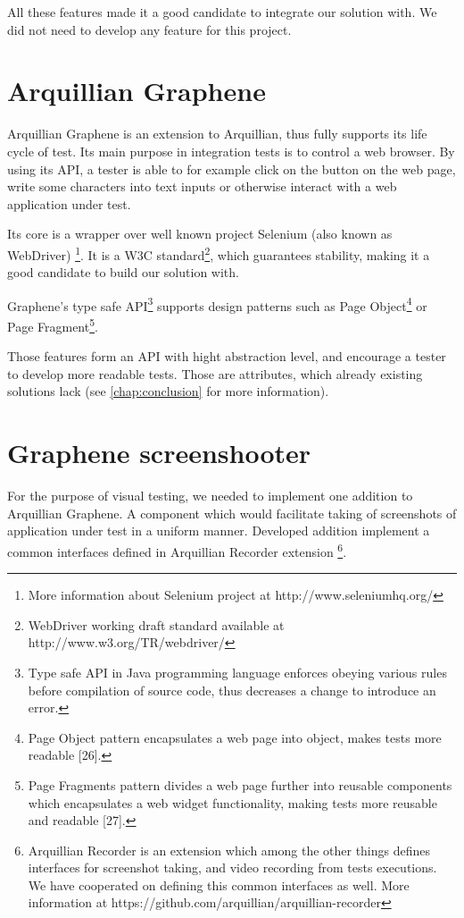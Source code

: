 \documentclass[11pt,oneside,final]{fithesis2}
\begin{document}
All these features made it a good candidate to integrate our solution with. We did not need to develop any
feature for this project.
  
\section{Arquillian Graphene}
Arquillian Graphene is an extension to Arquillian, thus fully supports its life cycle of test. Its main
purpose in integration tests is to control a web browser. By using its API, a tester is able to for example
click on the button on the web page, write some characters into text inputs or otherwise interact with
a web application under test.

Its core is a wrapper over well known project Selenium (also known as WebDriver) 
\footnote{More information about Selenium project at http://www.seleniumhq.org/}. It is a W3C 
standard\footnote{WebDriver working draft standard available at http://www.w3.org/TR/webdriver/},
which guarantees stability, making it a good candidate to build our solution with.

Graphene's type safe API\footnote{Type safe API in Java programming language enforces obeying various rules
before compilation of source code, thus decreases a change to introduce an error.} supports design patterns
such as Page Object\footnote{Page Object pattern encapsulates a web page into object, makes tests
more readable [26].} or Page Fragment\footnote{Page Fragments pattern divides a web page further into reusable 
components which encapsulates a web widget functionality, making tests more reusable and readable [27].}.

Those features form an API with hight abstraction level, and encourage a tester to develop more readable
tests. Those are attributes, which already existing solutions lack (see \ref{chap:conclusion} for more
information).

\section{Graphene screenshooter}
For the purpose of visual testing, we needed to implement one addition to Arquillian Graphene. 
A component which would facilitate taking of screenshots of application under test in a uniform manner.
Developed addition implement a common interfaces defined in Arquillian Recorder extension
\footnote{Arquillian Recorder is an extension which among the other things defines interfaces 
for screenshot taking, and video recording from tests executions. We have cooperated on defining this
common interfaces as well. More information at https://github.com/arquillian/arquillian-recorder}.
\end{document}

